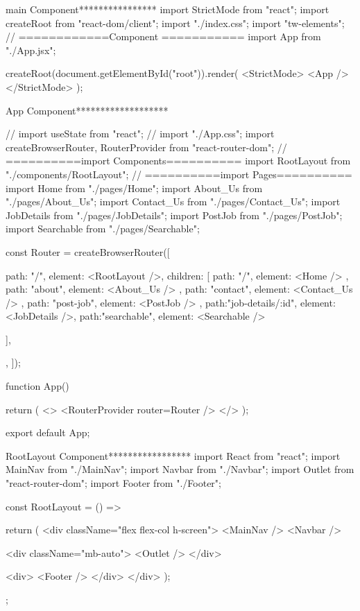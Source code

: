 main Component****************
import { StrictMode } from "react";
import { createRoot } from "react-dom/client";
import "./index.css";
import "tw-elements";
// ============Component ===========
import App from "./App.jsx";

createRoot(document.getElementById("root")).render(
  <StrictMode>
    <App />
  </StrictMode>
);











App Component*******************

// import { useState } from "react";
// import "./App.css";
import { createBrowserRouter, RouterProvider } from "react-router-dom";
// ==========import Components==========
import RootLayout from "./components/RootLayout";
// ==========import Pages==========
import Home from "./pages/Home";
import About_Us from "./pages/About_Us";
import Contact_Us from "./pages/Contact_Us";
import JobDetails from "./pages/JobDetails";
import PostJob from "./pages/PostJob";
import Searchable from "./pages/Searchable";



const Router = createBrowserRouter([
  {
    path: "/",
    element: <RootLayout />,
    children: [
      { path: "/", element: <Home /> },
      { path: "about", element: <About_Us /> },
      { path: "contact", element: <Contact_Us /> },
      { path: "post-job", element: <PostJob /> },
      {path:"job-details/:id", element: <JobDetails />},
      {path:"searchable", element: <Searchable />}

    ],
  },
]);

function App() {

  return (
    <>
      <RouterProvider router={Router} />
    </>
  );
}

export default App;











RootLayout Component*****************
import React from "react";
import MainNav from "./MainNav";
import Navbar from "./Navbar";
import { Outlet } from "react-router-dom";
import Footer from "./Footer";

const RootLayout = () => {
  return (
    <div className="flex flex-col h-screen">
      <MainNav />
      <Navbar />

      <div className="mb-auto">
        <Outlet />
      </div>

      <div>
        <Footer />
      </div>
    </div>
  );
};


